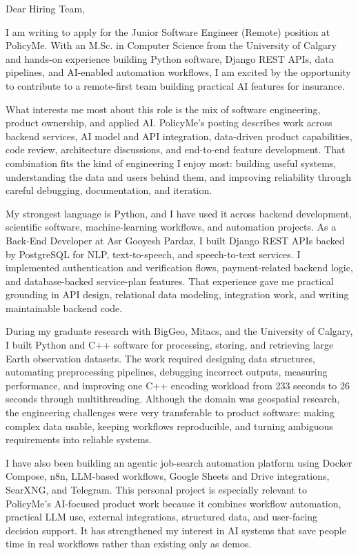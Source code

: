 \documentclass[11pt]{letter}
\begin{document}
\begin{letter}{}

\opening{Dear Hiring Team,}

I am writing to apply for the Junior Software Engineer (Remote) position at PolicyMe. With an M.Sc. in Computer Science from the University of Calgary and hands-on experience building Python software, Django REST APIs, data pipelines, and AI-enabled automation workflows, I am excited by the opportunity to contribute to a remote-first team building practical AI features for insurance.

What interests me most about this role is the mix of software engineering, product ownership, and applied AI. PolicyMe's posting describes work across backend services, AI model and API integration, data-driven product capabilities, code review, architecture discussions, and end-to-end feature development. That combination fits the kind of engineering I enjoy most: building useful systems, understanding the data and users behind them, and improving reliability through careful debugging, documentation, and iteration.

My strongest language is Python, and I have used it across backend development, scientific software, machine-learning workflows, and automation projects. As a Back-End Developer at Asr Gooyesh Pardaz, I built Django REST APIs backed by PostgreSQL for NLP, text-to-speech, and speech-to-text services. I implemented authentication and verification flows, payment-related backend logic, and database-backed service-plan features. That experience gave me practical grounding in API design, relational data modeling, integration work, and writing maintainable backend code.

During my graduate research with BigGeo, Mitacs, and the University of Calgary, I built Python and C++ software for processing, storing, and retrieving large Earth observation datasets. The work required designing data structures, automating preprocessing pipelines, debugging incorrect outputs, measuring performance, and improving one C++ encoding workload from 233 seconds to 26 seconds through multithreading. Although the domain was geospatial research, the engineering challenges were very transferable to product software: making complex data usable, keeping workflows reproducible, and turning ambiguous requirements into reliable systems.

I have also been building an agentic job-search automation platform using Docker Compose, n8n, LLM-based workflows, Google Sheets and Drive integrations, SearXNG, and Telegram. This personal project is especially relevant to PolicyMe's AI-focused product work because it combines workflow automation, practical LLM use, external integrations, structured data, and user-facing decision support. It has strengthened my interest in AI systems that save people time in real workflows rather than existing only as demos.


\end{letter}
\end{document}
